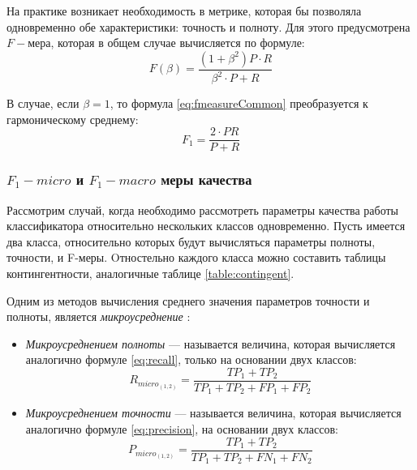         На практике возникает необходимость в метрике, которая бы позволяла одновременно
    обе характеристики: точность и полноту. Для этого предусмотрена $F-мера$, которая
    в общем случае вычисляется по формуле:
    \begin{equation}
        \label{eq:fmeasureCommon}
        F(\beta) = \dfrac{(1+\beta^2) P \cdot R}{\beta^2 \cdot P + R}
    \end{equation}

    В случае, если $\beta = 1$, то формула \ref{eq:fmeasureCommon} преобразуется
    к гармоническому среднему:
    \begin{equation}
        \label{eq:fmeasure}
        F_1 = \dfrac{2 \cdot P R}{P + R}
    \end{equation}

    \subsubsection{$F_1-micro$ и $F_1-macro$ меры качества}
    Рассмотрим случай, когда необходимо рассмотреть параметры качества работы
    классификатора относительно нескольких классов одновременно.
    Пусть имеется два класса, относительно которых будут вычисляться параметры полноты, точности,
    и F-меры.
    Oтностельно каждого класса можно составить таблицы контингентности,
    аналогичные таблице \ref{table:contingent}.

    Одним из методов вычисления среднего значения параметров точности и полноты,
    является {\it микроусреднение} \cite{microMacroMeasures}:
    \begin{itemize}
        \item {\it Микроусреднением полноты} --- называется величина, которая
            вычисляется аналогично формуле \ref{eq:recall}, только на основании
            двух классов:
            \begin{equation}
                R_{micro_{(1, 2)}} = \dfrac{TP_{1} + TP_{2}}{TP_{1} + TP_{2} + FP_{1} + FP_{2}} \nonumber
            \end{equation}
        \item {\it Микроусреднением точности} --- называется величина,
            которая вычисляется аналогично формуле \ref{eq:precision},
            на основании двух классов:
            \begin{equation}
                P_{micro_{(1, 2)}} = \dfrac{TP_{1} + TP_{2}}{TP_{1} + TP_{2} + FN_{1} + FN_{2}} \nonumber
            \end{equation}
    \end{itemize}


